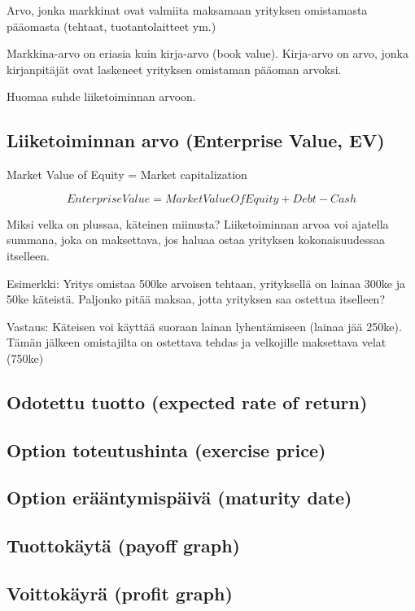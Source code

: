 \documentclass[a4paper]{article}
\begin{document}
Arvo, jonka markkinat ovat valmiita maksamaan yrityksen omistamasta pääomasta (tehtaat, tuotantolaitteet ym.)

Markkina-arvo on eriasia kuin kirja-arvo (book value). Kirja-arvo on arvo, jonka kirjanpitäjät ovat laskeneet yrityksen omistaman pääoman arvoksi.

Huomaa suhde liiketoiminnan arvoon.

\subsection{Liiketoiminnan arvo (Enterprise Value, EV)}

Market Value of Equity = Market capitalization

\[Enterprise Value = Market Value Of Equity + Debt - Cash\]

Miksi velka on plussaa, käteinen miinusta? Liiketoiminnan arvoa voi ajatella summana, joka on maksettava, jos haluaa ostaa yrityksen kokonaisuudessaa itselleen.

Esimerkki: Yritys omistaa 500ke arvoisen tehtaan, yrityksellä on lainaa 300ke ja 50ke käteistä. Paljonko pitää maksaa, jotta yrityksen saa ostettua itselleen?

Vastaus: Käteisen voi käyttää suoraan lainan lyhentämiseen (lainaa jää 250ke). Tämän jälkeen omistajilta on ostettava tehdas ja velkojille maksettava velat (750ke)

\subsection{Odotettu tuotto (expected rate of return)}

\subsection{Option toteutushinta (exercise price)}

\subsection{Option erääntymispäivä (maturity date)}

\subsection{Tuottokäytä (payoff graph)}

\subsection{Voittokäyrä (profit graph)}
\end{document}
